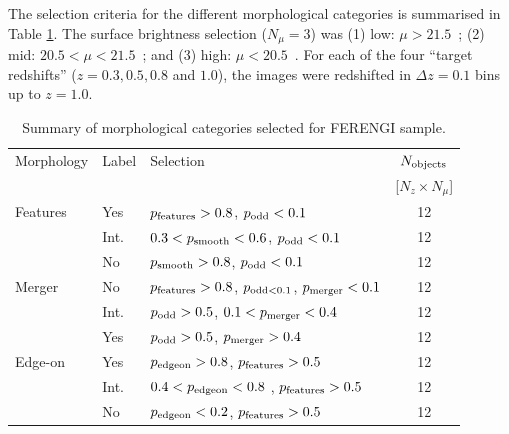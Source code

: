 \documentclass[twocolumn]{aastex6}
\begin{document}
The selection criteria for the different morphological categories is summarised in Table \ref{tbl:morphologies}. The surface brightness selection ($N_\mu = 3$) was (1) low: $\mu > 21.5$~\magarc;  (2) mid: $20.5 < \mu < 21.5$~\magarc; and (3) high: $\mu < 20.5$~\magarc. For each of the four ``target redshifts'' ($z = 0.3, 0.5, 0.8$ and $1.0$), the images were redshifted in $\Delta z = 0.1$ bins up to $z=1.0$. 
 
\begin{table}
\caption{Summary of morphological categories selected for FERENGI sample.\label{tbl:morphologies}}
\begin{tabular}{lllc}
\hline\hline
Morphology          & Label &  Selection                                                                                            & $N_{\rm objects}$ \\
                    &       &                                                                                                       & [$N_z \times N_\mu$] \\
\hline
Features            & Yes       & $p_{\rm features} > 0.8$, $p_{\rm odd} < 0.1$                                                         & 12 \\ 
                    & Int.      & $0.3 < p_{\rm smooth} < 0.6$, $p_{\rm odd} < 0.1$                                                     & 12 \\ 
                    & No        & $p_{\rm smooth} > 0.8$, $p_{\rm odd} < 0.1$                                                           & 12 \\ 
Merger              & No        & $p_{\rm features} > 0.8$, $p_{\rm odd < 0.1}$, $p_{\rm merger} < 0.1$                                 & 12 \\
                    & Int.      & $p_{\rm odd} > 0.5$, $0.1< p_{\rm merger} < 0.4$                                                      & 12 \\ 
                    & Yes       & $p_{\rm odd} > 0.5$, $p_{\rm merger} > 0.4$                                                           & 12 \\
Edge-on             & Yes       & $p_{\rm edgeon} > 0.8$, $p_{\rm features} > 0.5$                                                      & 12 \\
                    & Int.      & $0.4 < p_{\rm edgeon} < 0.8$ , $p_{\rm features} > 0.5$                                               & 12 \\
                    & No        & $p_{\rm edgeon} < 0.2$, $p_{\rm features} > 0.5$                                                      & 12 \\

\end{tabular}
\end{table}
\end{document}
